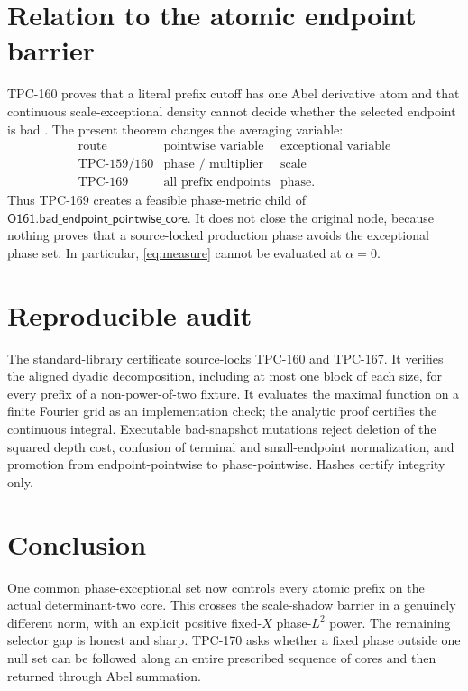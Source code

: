 \documentclass[11pt]{article}
\theoremstyle{definition}
\begin{document}
\section{Relation to the atomic endpoint barrier}

TPC-160 proves that a literal prefix cutoff has one Abel derivative
atom and that continuous scale-exceptional density cannot decide
whether the selected endpoint is bad \citep{WangTPC160}.  The present
theorem changes the averaging variable:
\[
 \begin{array}{c|c|c}
 \text{route}&\text{pointwise variable}&\text{exceptional variable}\\
 \hline
 \text{TPC-159/160}&\text{phase / multiplier}&\text{scale}\\
 \text{TPC-169}&\text{all prefix endpoints}&\text{phase}.
 \end{array}
\]
Thus TPC-169 creates a feasible phase-metric child of
\(\mathsf{O161.bad\_endpoint\_pointwise\_core}\).  It does not close
the original node, because nothing proves that a source-locked
production phase avoids the exceptional phase set.  In particular,
\eqref{eq:measure} cannot be evaluated at \(\alpha=0\).

\section{Reproducible audit}

The standard-library certificate source-locks TPC-160 and TPC-167.
It verifies the aligned dyadic decomposition, including at most one
block of each size, for every prefix of a non-power-of-two fixture.
It evaluates the maximal function on a finite Fourier grid as an
implementation check; the analytic proof certifies the continuous
integral.  Executable bad-snapshot mutations reject deletion of the
squared depth cost, confusion of terminal and small-endpoint
normalization, and promotion from endpoint-pointwise to
phase-pointwise.  Hashes certify integrity only.

\section{Conclusion}

One common phase-exceptional set now controls every atomic prefix on
the actual determinant-two core.  This crosses the scale-shadow
barrier in a genuinely different norm, with an explicit positive
fixed-\(X\) phase-\(L^2\) power.  The remaining selector gap is
honest and sharp.  TPC-170 asks whether a fixed phase outside one
null set can be followed along an entire prescribed sequence of
cores and then returned through Abel summation.



\end{document}
